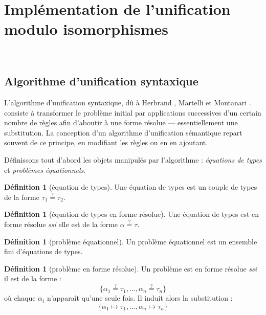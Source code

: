 \documentclass[a4paper]{report}
\theoremstyle{definition}
\newtheorem{definition}[theoreme]{Définition}
\newcommand{\qeq}{\stackrel {\scriptscriptstyle ?} =}
\newcommand{\ssi}{\textit{ssi}\xspace}
\newcommand\laure[1]{{\bf\color{WildStrawberry}{TODO: #1}}\\}
\begin{document}

\section{Implémentation de l'unification modulo isomorphismes}


\laure{Nous décrivons maintenant .....}

\subsection{Algorithme d'unification syntaxique}


L'algorithme d'unification syntaxique, dû à Herbrand \cite{Herbrand}, Martelli et Montanari \cite{Martelli_Montanari}.  consiste à transformer le problème initial par applications successives d'un certain nombre de règles afin d'aboutir à une forme résolue — essentiellement une substitution. La conception d'un algorithme d'unification sémantique repart souvent de ce principe, en modifiant les règles ou en en ajoutant.

Définissons tout d'abord les objets manipulés par l'algorithme : \emph{équations de types} et \emph{problèmes équationnels}.

\begin{definition}[équation de types]
  Une équation de types est un couple de types de la forme $\tau_1 \qeq \tau_2$.
\end{definition}

\begin{definition}[équation de types en forme résolue]
  Une équation de types est en forme résolue \ssi elle est de la forme $\alpha \qeq \tau$.
\end{definition}

\begin{definition}[problème équationnel]
  Un problème équationnel est un ensemble fini d'équations de types.
\end{definition}

\begin{definition}[problème en forme résolue]
  Un problème est en forme résolue \ssi il est de la forme :
  \[ \{ \alpha_1 \qeq \tau_1, \dots, \alpha_n \qeq \tau_n \} \]
  où chaque $\alpha_i$ n'apparaît qu'une seule fois. Il induit alors la substitution :
  \[ \{ \alpha_1 \mapsto \tau_1, \dots, \alpha_n \mapsto \tau_n \} \]
\end{definition}
\end{document}
